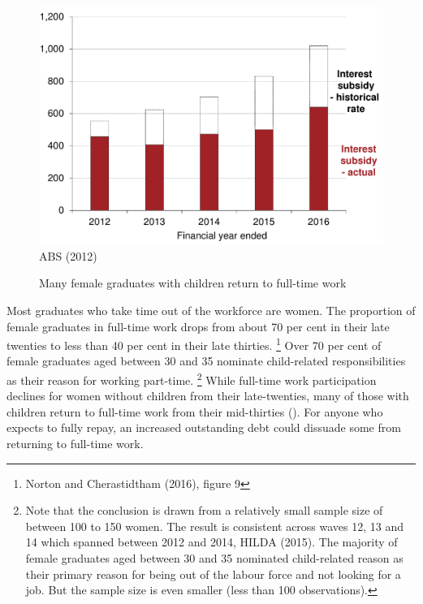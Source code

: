 \documentclass[embargoed]{grattan}
\begin{document}
\begin{figure}
\caption{Many female graduates with children return to full-time work}\label{fig:fig16-many-female-grads-with-children-return-to-full-time-work}


\includegraphics[page=16]{atlas/Chartpack.pdf}
{ABS (2012)}
\end{figure}

Most graduates who take time out of the workforce are women.
The proportion of female graduates in full-time work drops from about 70 per cent in their late twenties to less than 40 per cent in their late thirties.%
\footnote{Norton and Cherastidtham (2016), figure 9} Over 70 per cent of female graduates aged between 30 and 35 nominate child-related responsibilities as their reason for working part-time.%
\footnote{Note that the conclusion is drawn from a relatively small sample size of between 100 to 150 women.
The result is consistent across waves 12, 13 and 14 which spanned between 2012 and 2014, HILDA (2015).
The majority of female graduates aged between 30 and 35 nominated child-related reason as their primary reason for being out of the labour force and not looking for a job.
But the sample size is even smaller (less than 100 observations).} While full-time work participation declines for women without children from their late-twenties, many of those with children return to full-time work from their mid-thirties ().
For anyone who expects to fully repay, an increased outstanding debt could dissuade some from returning to full-time work.
\end{document}
